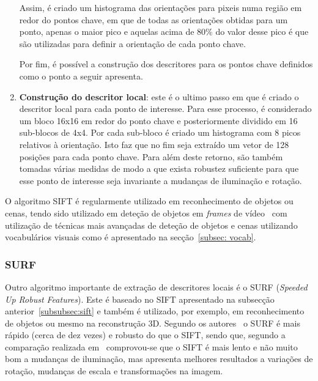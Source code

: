 \begin{enumerate}
Assim, é criado um histograma das orientações para pixeis numa região em redor do pontos chave, em que de todas as orientações obtidas para um ponto, apenas o maior pico e aquelas acima de 80\% do valor desse pico é que são utilizadas para definir a orientação de cada ponto chave.

Por fim, é possível a construção dos descritores para os pontos chave definidos como o ponto a seguir apresenta.

\item \textbf{Construção do descritor local}: este é o ultimo passo em que é criado o descritor local para cada ponto de interesse. Para esse processo, é considerado um bloco 16x16 em redor do ponto chave e posteriormente dividido em 16 sub-blocos de 4x4. Por cada sub-bloco é criado um histograma com 8 picos relativos à orientação. Isto faz que no fim seja extraído um vetor de 128 posições para cada ponto chave. Para além deste retorno, são também tomadas várias medidas de modo a que exista robustez suficiente para que esse ponto de interesse seja invariante a mudanças de iluminação e rotação. 

\begin{figure}
\end{figure}
 
\end{enumerate}

O algoritmo SIFT é regularmente utilizado em reconhecimento de objetos ou cenas, tendo sido utilizado em deteção de objetos em \textit{frames} de vídeo~\cite{Sivic2003, Sivic2006} com utilização de técnicas mais avançadas de deteção de objetos e cenas utilizando vocabulários visuais como é apresentado na secção~\ref{subsec: vocab}.

\subsubsection{SURF} \label{subsubsec:surf}

Outro algoritmo importante de extração de descritores locais é o SURF (\textit{Speeded Up Robust Features}). Este é baseado no SIFT apresentado na subsecção anterior~\ref{subsubsec:sift} e também é utilizado, por exemplo, em reconhecimento de objetos ou mesmo na reconstrução 3D. Segundo os autores~\cite{Bay2006} o SURF é mais rápido (cerca de dez vezes) e robusto do que o SIFT, sendo que, segundo a comparação realizada em~\cite{Juan2009} comprovou-se que o SIFT é mais lento e não muito bom a mudanças de iluminação, mas apresenta melhores resultados a variações de rotação, mudanças de escala e transformações na imagem.


